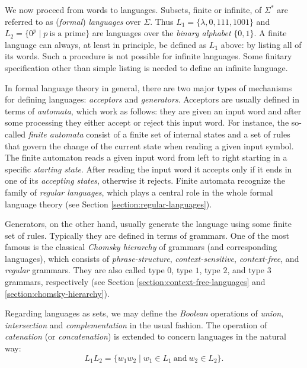 We now proceed from words to languages. Subsets, finite or infinite, of $\Sigma^*$ are referred to as (\emph{formal}) \emph{languages} over $\Sigma$. Thus $L_1 = \{\lambda, 0, 111, 1001\}$ and $L_2 = \{0^p \mid p \ \text{is a prime}\}$ are languages over the \emph{binary alphabet} $\{0, 1\}$. A finite language can always, at least in principle, be defined as $L_1$ above: by listing all of its words. Such a procedure is not possible for infinite languages. Some finitary specification other than simple listing is needed to define an infinite language. 

In formal language theory in general, there are two major types of mechanisms for defining languages: \emph{acceptors} and \emph{generators}. Acceptors are usually defined in terms of \emph{automata}, which work as follows: they are given an input word and after some processing they either accept or reject this input word. For instance, the so-called \emph{finite automata} consist of a finite set of internal states and a set of rules that govern the change of the current state when reading a given input symbol. The finite automaton reads a given input word from left to right starting in a specific \emph{starting state}. After reading the input word it accepts only if it ends in one of its \emph{accepting states}, otherwise it rejects. Finite automata recognize the family of \emph{regular languages}, which plays a central role in the whole formal language theory (see Section \ref{section:regular-languages}).

Generators, on the other hand, usually generate the language using some finite set of rules. Typically they are defined in terms of grammars. One of the most famous is the classical \emph{Chomsky hierarchy} of grammars (and corresponding languages), which consists of \emph{phrase-structure}, \emph{context-sensitive}, \emph{context-free}, and \emph{regular} grammars. They are also called type $0$, type $1$, type $2$, and type $3$ grammars, respectively (see Section \ref{section:context-free-languages} and \ref{section:chomsky-hierarchy}).

Regarding languages as sets, we may define the \emph{Boolean} operations of \emph{union}, \emph{intersection} and \emph{complementation} in the usual fashion. The operation of \emph{catenation} (or \emph{concatenation}) is extended to concern languages in the natural way:
$$L_1 L_2 = \{w_1 w_2 \mid w_1 \in L_1 \ \text{and} \ w_2 \in L_2\}.$$

